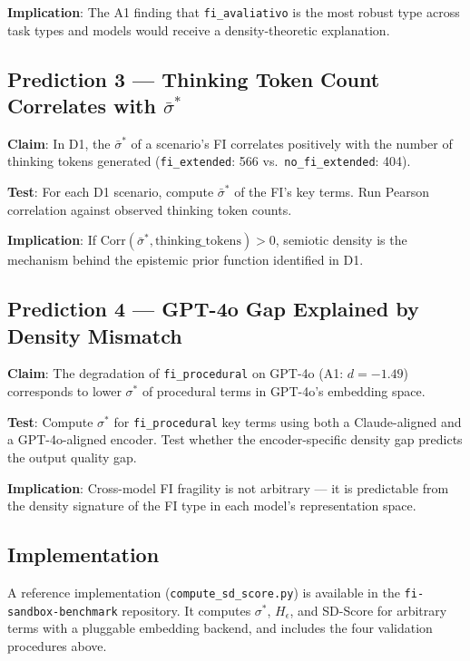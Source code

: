 \documentclass[12pt,a4paper]{article}
\begin{document}
\textbf{Implication}: The A1 finding that \texttt{fi\_avaliativo} is the most robust
type across task types and models would receive a density-theoretic explanation.

\subsection*{Prediction 3 — Thinking Token Count Correlates with $\bar{\sigma}^*$}

\textbf{Claim}: In D1, the $\bar{\sigma}^*$ of a scenario's FI correlates positively
with the number of thinking tokens generated (\texttt{fi\_extended}: 566 vs.\ \texttt{no\_fi\_extended}: 404).

\textbf{Test}: For each D1 scenario, compute $\bar{\sigma}^*$ of the FI's key terms.
Run Pearson correlation against observed thinking token counts.

\textbf{Implication}: If $\mathrm{Corr}(\bar{\sigma}^*, \text{thinking\_tokens}) > 0$,
semiotic density is the mechanism behind the epistemic prior function identified in D1.

\subsection*{Prediction 4 — GPT-4o Gap Explained by Density Mismatch}

\textbf{Claim}: The degradation of \texttt{fi\_procedural} on GPT-4o (A1: $d = -1.49$)
corresponds to lower $\sigma^*$ of procedural terms in GPT-4o's embedding space.

\textbf{Test}: Compute $\sigma^*$ for \texttt{fi\_procedural} key terms using both a
Claude-aligned and a GPT-4o-aligned encoder. Test whether the encoder-specific density
gap predicts the output quality gap.

\textbf{Implication}: Cross-model FI fragility is not arbitrary — it is predictable
from the density signature of the FI type in each model's representation space.

\subsection*{Implementation}

A reference implementation (\texttt{compute\_sd\_score.py}) is available in the
\texttt{fi-sandbox-benchmark} repository.
It computes $\sigma^*$, $H_\epsilon$, and SD-Score for arbitrary terms with a pluggable
embedding backend, and includes the four validation procedures above.
\end{document}
